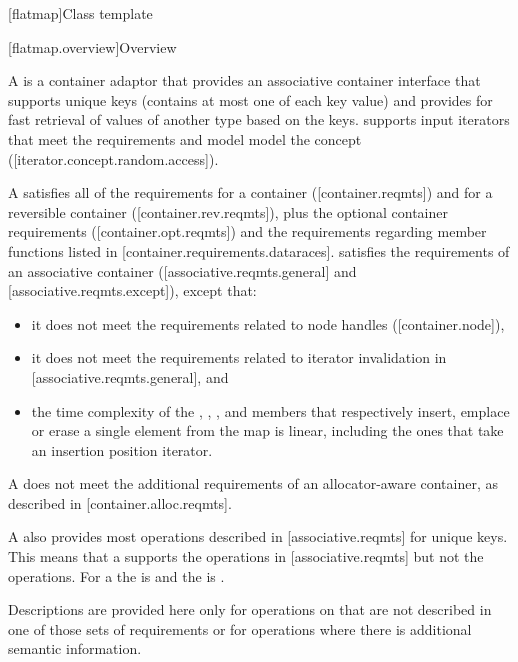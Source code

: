 \setcounter{subsection}{7}
\begin{addedblock}
[flatmap]{Class template }

[flatmap.overview]{Overview}

\pnum
{}%
A  is a container adaptor that provides an associative
container interface that supports unique keys (contains at most one of each
key value) and provides for fast retrieval of values of another type 
based on the keys.  supports input iterators that meet the
 requirements and model model the 
concept ([iterator.concept.random.access]).

\pnum
A  satisfies all of the requirements for a container
([container.reqmts]) and for a reversible container ([container.rev.reqmts]),
plus the optional container requirements ([container.opt.reqmts]) and the
requirements regarding  member functions listed in
[container.requirements.dataraces].   satisfies the
requirements of an associative container ([associative.reqmts.general] and
[associative.reqmts.except]), except that:
\begin{itemize}
\item it does not meet the requirements related to node handles ([container.node]),
\item it does not meet the requirements related to iterator invalidation in [associative.reqmts.general], and
\item the time complexity of the , , ,
and  members that respectively insert, emplace or erase a single
element from the map is linear, including the ones that take an insertion
position iterator.
\end{itemize}
A  does not meet the additional requirements of an
allocator-aware container, as described in [container.alloc.reqmts].

\pnum
A  also provides most operations described
in [associative.reqmts] for unique keys.  This means that a
 supports the  operations
in [associative.reqmts] but not the  operations.  For
a  the  is  and the
 is .

\pnum
Descriptions are provided here only for operations on  that
are not described in one of those sets of requirements or for operations where
there is additional semantic information.


\end{addedblock}
